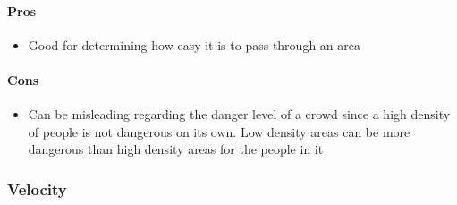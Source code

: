 
\paragraph{Pros}
\begin{itemize}
    \item Good for determining how easy it is to pass through an area
\end{itemize}

\paragraph{Cons}
\begin{itemize}
    \item Can be misleading regarding the danger level of a crowd since a high density of people is not dangerous on its own. Low density areas can be more dangerous than high density areas for the people in it
\end{itemize}

\subsubsection{Velocity}

